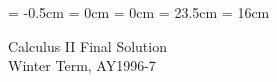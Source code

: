

\topmargin = -0.5cm
\oddsidemargin = 0cm \evensidemargin = 0cm
\textheight = 23.5cm \textwidth = 16cm

\pagestyle{empty}

\newtheorem{thm}{定理}
\newcommand{\proof}{{\gt 証明\quad}}
\newcommand{\sol}{{\gt 解答\quad}}
\newcommand{\qed}{\hfill\hbox{\rule{6pt}{6pt}}}

\def\inkern{\mathchoice{\!\!\!}{\!\!}{\!\!}{\!\!}}
\def\iint{\int\inkern\int} %
\def\iiint{\int\inkern\int\inkern\int} %


\begin{center}
{\gt\LARGE Calculus II  Final Solution}\\
{\gt Winter Term, AY1996-7}
\end{center}

